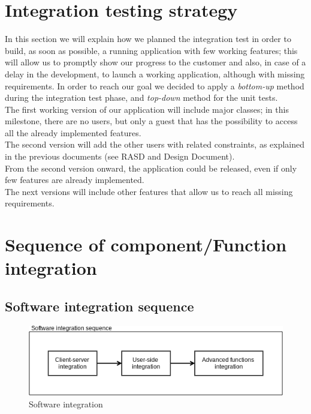 \section{Integration testing strategy}
In this section we will explain how we planned the integration test
in order to build, as soon as possible, a running application 
with few working features; this will allow us to promptly show
our progress to the customer and also, in case of a delay in the development, 
to launch a working application, although with missing requirements.
In order to reach our goal we decided to apply a \textit{bottom-up} method
during the integration test phase, and \textit{top-down} method for the unit tests.\\
The first working version of our application will include major classes;
in this milestone, there are no users, but only a guest that has the possibility  %
to access all the already implemented features.\\
The second version will add the other users with related constraints,
as explained in the previous documents (see RASD and Design Document).\\
From the second version onward, the application could be released,
even if only few features are already implemented.\\
The next versions will include other features that allow us to reach  %
all missing requirements.

\section{Sequence of component/Function integration}

\subsection{Software integration sequence}
\begin{figure} [h]
  \centering
  \includegraphics[scale=0.72]{diagrams/software integration.png}
  \caption{\label{fig:soft_int} Software integration}
\end{figure}

